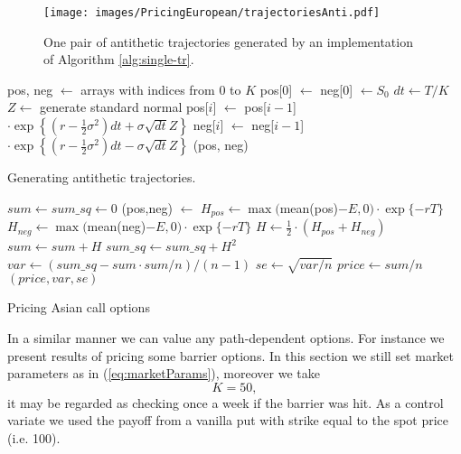 \documentclass[a4paper,11pt, twoside]{book}
\theoremstyle{definition}
\theoremstyle{remark}
\begin{document}
\begin{figure}
\centering
 \texttt{[image: images/PricingEuropean/trajectoriesAnti.pdf]}
\caption{One pair of antithetic trajectories generated by an implementation of Algorithm \ref{alg:single-tr}.}
\label{fig:trajectoriesAnti}
\end{figure}
\begin{algorithm}
 \begin{algorithmic}[1]
  \State pos, neg $\gets$ arrays with indices from $0$ to $K$
  \State pos[0] $\gets$ neg[0] $\gets S_0$
  \State $dt \gets T/K$
    \State $Z \gets$ generate standard normal
    \State pos[$i$] $\gets$ pos[$i-1$] $\cdot \exp\left\{ (r - \frac{1}{2}\sigma^2) dt + \sigma \sqrt{dt} Z \right\}$
    \State neg[$i$] $\gets$ neg[$i-1$] $\cdot \exp\left\{ (r - \frac{1}{2}\sigma^2) dt - \sigma \sqrt{dt} Z \right\}$
  \EndFor
  \State \Return (pos, neg)
  \EndFunction
 \end{algorithmic}
 \caption{Generating antithetic trajectories.}
 \label{alg:single-tr}
\end{algorithm}
 
\begin{algorithm}
 \begin{algorithmic}[1]
    \State  $sum \gets sum\_sq \gets 0$
      \State (pos,neg) $\gets$ 
      \State $H_{pos} \gets \max($mean(pos)$- E, 0) \cdot \exp\{-rT\}$
      \State $H_{neg} \gets \max($mean(neg)$- E, 0) \cdot \exp\{-rT\}$
      \State $H \gets \frac{1}{2} \cdot (H_{pos} + H_{neg})$
      \State $sum \gets sum + H$
      \State $ sum\_sq \gets sum\_sq + H^2$
    \EndFor
    \State $var \gets (sum\_sq - sum \cdot sum/n) / (n-1)$
    \State $se \gets \sqrt{var / n}$
    \State $price \gets sum / n$
    \State \Return $(price, var, se)$
  \EndFunction
 \end{algorithmic}
 \caption{Pricing Asian call options}
 \label{alg:priceAsianAV}
\end{algorithm}

In a similar manner we can value any path-dependent options. For instance we present results of pricing some barrier options. In this section we still set market parameters as in (\ref{eq:marketParams}), moreover we take
\[ K = 50, \]
it may be regarded as checking once a week if the barrier was hit. As a control variate we used the payoff from a vanilla put with strike equal to the spot price (i.e. 100).
\end{document}
